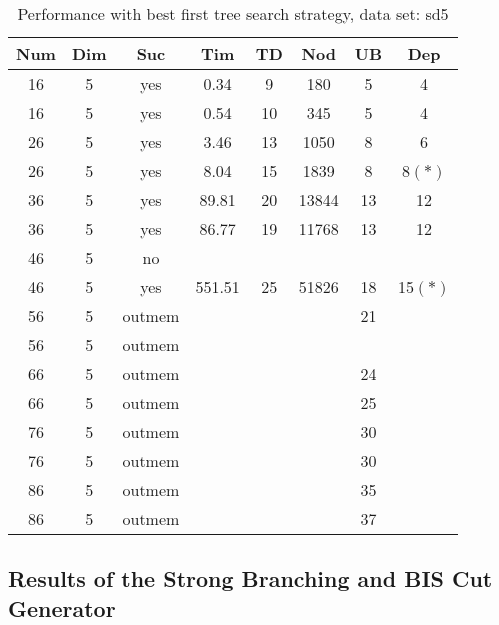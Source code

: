 \begin{table}[!htb]
  \centering
  \begin{tabular}[center]{|c|c|c|c|c|c|c|c|}
    \hline
    Num & Dim & Suc & Tim & TD & Nod & UB & Dep \\
    \hline
    16 & 5 & yes & 0.34 & 9 & 180 & 5 & 4 \\
    16 & 5 & yes & 0.54 & 10 & 345 & 5 & 4 \\
    26 & 5 & yes & 3.46 & 13 & 1050 & 8 & 6 \\
    26 & 5 & yes & 8.04 & 15 & 1839 & 8 & 8$(*)$ \\
    36 & 5 & yes & 89.81 & 20 & 13844 & 13 & 12 \\
    36 & 5 & yes & 86.77 & 19 & 11768 & 13 & 12 \\
    46 & 5 & no &  &  &  &  &  \\
    46 & 5 & yes & 551.51 & 25 & 51826 & 18 & 15$(*)$ \\
    56 & 5 & outmem &&&& 21 &\\
    56 & 5 & outmem &&&&  &\\
    66 & 5 & outmem &&&& 24 &\\
    66 & 5 & outmem &&&& 25 &\\
    76 & 5 & outmem &&&& 30 &\\
    76 & 5 & outmem &&&& 30 &\\
    86 & 5 & outmem &&&& 35 &\\
    86 & 5 & outmem &&&& 37 &\\
    \hline
  \end{tabular}
  \caption{Performance with best first tree search strategy, data set: sd5}
  \label{tab:test.sel-sd5}
\end{table}

\clearpage
\subsection{Results of the Strong Branching and BIS Cut Generator}
\label{sec:apd.bac.cutbis}

